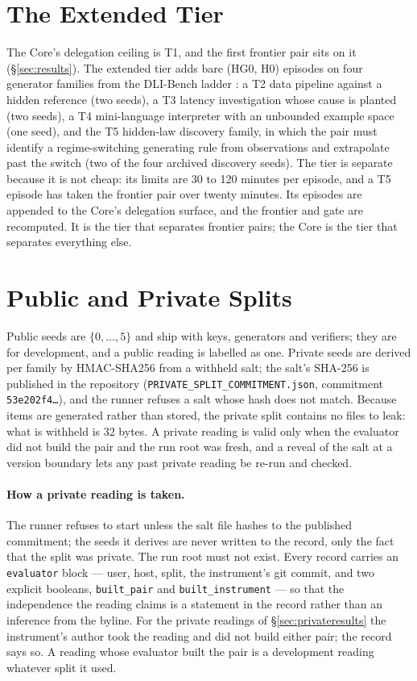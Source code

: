 \section{The Extended Tier}\label{sec:extended}

The Core's delegation ceiling is T1, and the first frontier pair sits on it (\S\ref{sec:results}). The extended tier adds bare (HG0, H0) episodes on four generator families from the DLI-Bench ladder \citep{yang2026dlibench}: a T2 data pipeline against a hidden reference (two seeds), a T3 latency investigation whose cause is planted (two seeds), a T4 mini-language interpreter with an unbounded example space (one seed), and the T5 hidden-law discovery family, in which the pair must identify a regime-switching generating rule from observations and extrapolate past the switch (two of the four archived discovery seeds). The tier is separate because it is not cheap: its limits are 30 to 120 minutes per episode, and a T5 episode has taken the frontier pair over twenty minutes. Its episodes are appended to the Core's delegation surface, and the frontier and gate are recomputed. It is the tier that separates frontier pairs; the Core is the tier that separates everything else.

\section{Public and Private Splits}\label{sec:splits}

Public seeds are $\{0,\ldots,5\}$ and ship with keys, generators and verifiers; they are for development, and a public reading is labelled as one. Private seeds are derived per family by HMAC-SHA256 from a withheld salt; the salt's SHA-256 is published in the repository (\texttt{PRIVATE\_SPLIT\_COMMITMENT.json}, commitment \texttt{53e202f4\ldots}), and the runner refuses a salt whose hash does not match. Because items are generated rather than stored, the private split contains no files to leak: what is withheld is 32 bytes. A private reading is valid only when the evaluator did not build the pair and the run root was fresh, and a reveal of the salt at a version boundary lets any past private reading be re-run and checked.

\paragraph{How a private reading is taken.} The runner refuses to start unless the salt file hashes to the published commitment; the seeds it derives are never written to the record, only the fact that the split was private. The run root must not exist. Every record carries an \texttt{evaluator} block --- user, host, split, the instrument's git commit, and two explicit booleans, \texttt{built\_pair} and \texttt{built\_instrument} --- so that the independence the reading claims is a statement in the record rather than an inference from the byline. For the private readings of \S\ref{sec:privateresults} the instrument's author took the reading and did not build either pair; the record says so. A reading whose evaluator built the pair is a development reading whatever split it used.

